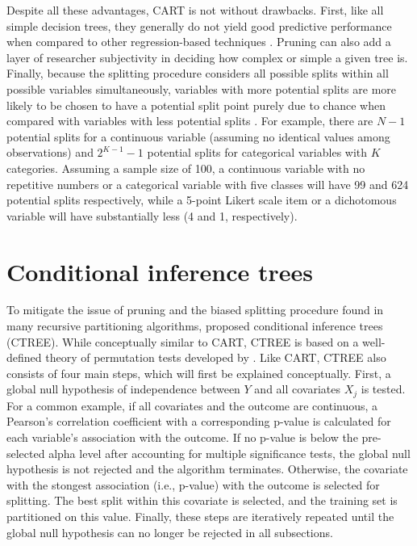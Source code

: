 	Despite all these advantages, CART is not without drawbacks. First, like all simple decision trees, they generally do not yield good predictive performance when compared to other regression-based techniques \cite{james2013introduction}. Pruning can also add a layer of researcher subjectivity in deciding how complex or simple a given tree is. Finally, because the splitting procedure considers all possible splits within all possible variables simultaneously, variables with more potential splits are more likely to be chosen to have a potential split point purely due to chance when compared with variables with less potential splits \cite{loh1997split, quinlan1995oversearching}. For example, there are $N - 1$ potential splits for a continuous variable (assuming no identical values among observations) and $2^{K - 1} - 1$ potential splits for categorical variables with $K$ categories. Assuming a sample size of 100, a continuous variable with no repetitive numbers or a categorical variable with five classes will have 99 and 624 potential splits respectively, while a 5-point Likert scale item or a dichotomous variable will have substantially less (4 and 1, respectively).



\section{Conditional inference trees}


	To mitigate the issue of pruning and the biased splitting procedure found in many recursive partitioning algorithms,  proposed conditional inference trees (CTREE). While conceptually similar to CART, CTREE is based on a well-defined theory of permutation tests developed by . Like CART, CTREE also consists of four main steps, which will first be explained conceptually. First, a global null hypothesis of independence between $Y$ and all covariates $X_j$ is tested. For a common example, if all covariates and the outcome are continuous, a Pearson's correlation coefficient with a corresponding p-value is calculated for each variable's association with the outcome. If no p-value is below the pre-selected alpha level after accounting for multiple significance tests, the global null hypothesis is not rejected and the algorithm terminates. Otherwise, the covariate with the stongest association (i.e., p-value) with the outcome is selected for splitting. The best split within this covariate is selected, and the training set is partitioned on this value. Finally, these steps are iteratively repeated until the global null hypothesis can no longer be rejected in all subsections. 

